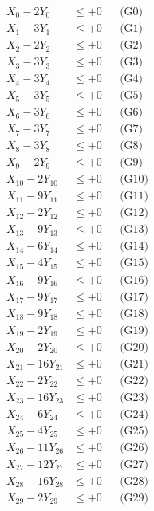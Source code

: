 \documentclass[a4paper,10pt]{article}
\begin{document}
\allowdisplaybreaks
{\small
\begin{align}
X_{0} - 2Y_{0} &\leq +0 && \text{(G0)} \\
X_{1} - 3Y_{1} &\leq +0 && \text{(G1)} \\
X_{2} - 2Y_{2} &\leq +0 && \text{(G2)} \\
X_{3} - 3Y_{3} &\leq +0 && \text{(G3)} \\
X_{4} - 3Y_{4} &\leq +0 && \text{(G4)} \\
X_{5} - 3Y_{5} &\leq +0 && \text{(G5)} \\
X_{6} - 3Y_{6} &\leq +0 && \text{(G6)} \\
X_{7} - 3Y_{7} &\leq +0 && \text{(G7)} \\
X_{8} - 3Y_{8} &\leq +0 && \text{(G8)} \\
X_{9} - 2Y_{9} &\leq +0 && \text{(G9)} \\
\allowbreak
X_{10} - 2Y_{10} &\leq +0 && \text{(G10)} \\
X_{11} - 9Y_{11} &\leq +0 && \text{(G11)} \\
X_{12} - 2Y_{12} &\leq +0 && \text{(G12)} \\
X_{13} - 9Y_{13} &\leq +0 && \text{(G13)} \\
X_{14} - 6Y_{14} &\leq +0 && \text{(G14)} \\
X_{15} - 4Y_{15} &\leq +0 && \text{(G15)} \\
X_{16} - 9Y_{16} &\leq +0 && \text{(G16)} \\
X_{17} - 9Y_{17} &\leq +0 && \text{(G17)} \\
X_{18} - 9Y_{18} &\leq +0 && \text{(G18)} \\
X_{19} - 2Y_{19} &\leq +0 && \text{(G19)} \\
\allowbreak
X_{20} - 2Y_{20} &\leq +0 && \text{(G20)} \\
X_{21} - 16Y_{21} &\leq +0 && \text{(G21)} \\
X_{22} - 2Y_{22} &\leq +0 && \text{(G22)} \\
X_{23} - 16Y_{23} &\leq +0 && \text{(G23)} \\
X_{24} - 6Y_{24} &\leq +0 && \text{(G24)} \\
X_{25} - 4Y_{25} &\leq +0 && \text{(G25)} \\
X_{26} - 11Y_{26} &\leq +0 && \text{(G26)} \\
X_{27} - 12Y_{27} &\leq +0 && \text{(G27)} \\
X_{28} - 16Y_{28} &\leq +0 && \text{(G28)} \\
X_{29} - 2Y_{29} &\leq +0 && \text{(G29)} \\

\end{align}}
\end{document}
